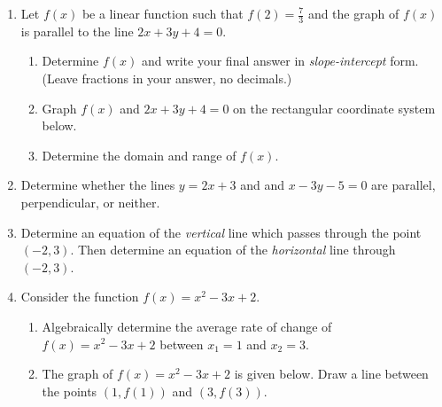 \begin{enumerate}
\item Let $f(x)$ be a linear function such that $\displaystyle f(2)=\frac{7}{3}$ and the graph of $f(x)$ is parallel to the line $2x+3y+4=0$. 
\begin{enumerate}
\item Determine $f(x)$ and write your final answer in \emph{slope-intercept} form. (Leave fractions in your answer, no decimals.)
\vfill
\item Graph $f(x)$ and  $2x+3y+4=0$ on the rectangular coordinate system below.\\

\item Determine the domain and range of $f(x)$.\\[.5in]
\end{enumerate}


\newpage
\item Determine whether the lines $y= 2x+3$ and and $x-3y-5=0$ are parallel, perpendicular, or neither. \vfill


\item Determine an equation of the \emph{vertical} line which passes through the point $(-2, 3)$. Then determine an equation of the \emph{horizontal} line through $(-2,3)$.\vfill

\newpage

\item Consider the function $f(x)=x^2-3x+2$.
\begin{enumerate}
\item Algebraically determine the average rate of change of $f(x)=x^2-3x+2$ between $x_1=1$ and $x_2=3$.
\vfill



\item The graph of $f(x)=x^2-3x+2$ is given below.  Draw a line between the points $(1,f(1))$ and $(3,f(3))$.\\


\end{enumerate}
\end{enumerate}
